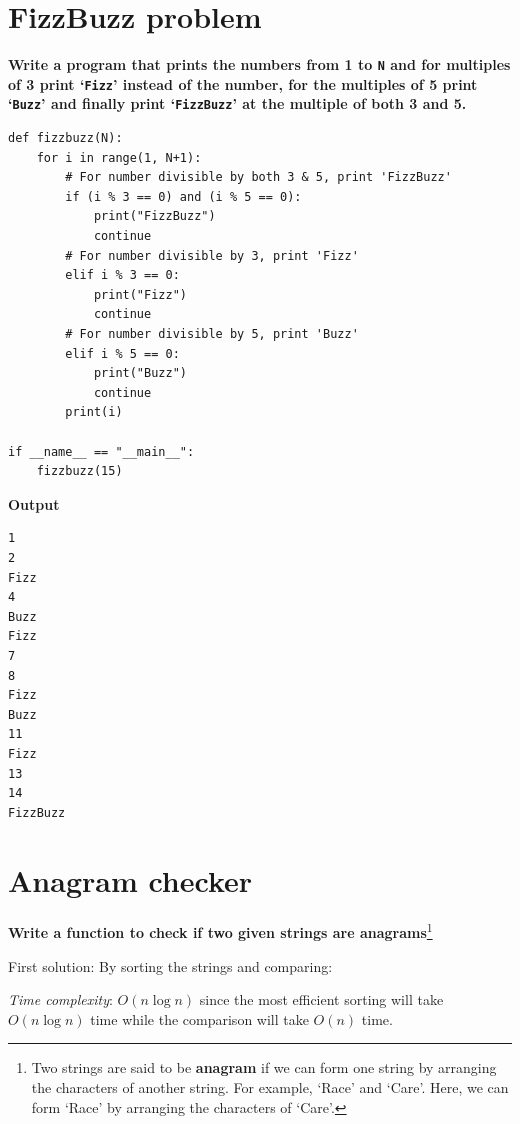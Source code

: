 \documentclass[a4paper,11pt]{book}
\begin{document}
\newpage
\section{FizzBuzz problem}

\textbf{Write a program that prints the numbers from 1 to \lstinline{N} and for multiples of 3 print `\lstinline{Fizz}' instead of the number, for the multiples of 5 print `\lstinline{Buzz}' and finally print `\lstinline{FizzBuzz}' at the multiple of both 3 and 5.}
\vspace{5mm}
\begin{lstlisting}
def fizzbuzz(N):
    for i in range(1, N+1):
        # For number divisible by both 3 & 5, print 'FizzBuzz'
        if (i % 3 == 0) and (i % 5 == 0):
            print("FizzBuzz")                                        
            continue
        # For number divisible by 3, print 'Fizz'
        elif i % 3 == 0:    
            print("Fizz")                                        
            continue
        # For number divisible by 5, print 'Buzz'
        elif i % 5 == 0:        
            print("Buzz")                                    
            continue
        print(i)

if __name__ == "__main__":
    fizzbuzz(15)
\end{lstlisting}
\textbf{Output}
\begin{lstlisting}
1
2
Fizz
4
Buzz
Fizz
7
8
Fizz
Buzz
11
Fizz
13
14
FizzBuzz
\end{lstlisting}

\newpage
\section{Anagram checker}

\noindent \textbf{Write a function to check if two given strings are anagrams}\footnote{Two strings are said to be \textbf{anagram} if we can form one string by arranging the characters of another string. For example, `Race' and `Care'. Here, we can form `Race' by arranging the characters of `Care'.}
\vspace{5mm}

\noindent First solution: By sorting the strings and comparing:

\noindent \textit{Time complexity}: $O(n\log n)$ since the most efficient sorting will take $O(n\log n)$ time while the comparison will take $O(n)$ time.
\end{document}
